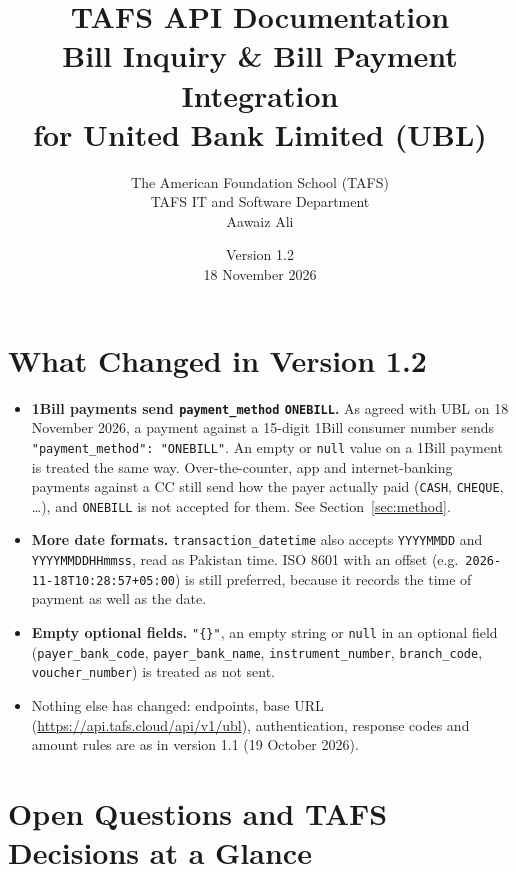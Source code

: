 \documentclass[11pt]{article}
\title{\textbf{TAFS API Documentation} \\[4pt]
\large Bill Inquiry \& Bill Payment Integration \\ for United Bank Limited (UBL)}
\author{The American Foundation School (TAFS) \\ TAFS IT and Software Department \\[4pt] Aawaiz Ali}
\date{Version 1.2 \\ 18 November 2026}
\begin{document}
\begin{titlepage}
\vspace*{\fill}
{\let\newpage\relax\maketitle}
\thispagestyle{empty}
\vspace*{\fill}
\end{titlepage}

\section*{What Changed in Version 1.2}
\begin{itemize}
  \item \textbf{1Bill payments send \texttt{payment\_method} \texttt{ONEBILL}.} As agreed with UBL on 18 November 2026,
        a payment against a 15-digit 1Bill consumer number sends \texttt{"payment\_method": "ONEBILL"}. An empty or
        \texttt{null} value on a 1Bill payment is treated the same way. Over-the-counter, app and internet-banking payments
        against a CC still send how the payer actually paid (\texttt{CASH}, \texttt{CHEQUE}, \ldots), and
        \texttt{ONEBILL} is not accepted for them. See Section~\ref{sec:method}.
  \item \textbf{More date formats.} \texttt{transaction\_datetime} also accepts \texttt{YYYYMMDD} and
        \texttt{YYYYMMDDHHmmss}, read as Pakistan time. ISO 8601 with an offset (e.g.\ \texttt{2026-11-18T10:28:57+05:00})
        is still preferred, because it records the time of payment as well as the date.
  \item \textbf{Empty optional fields.} \texttt{"\{\}"}, an empty string or \texttt{null} in an optional field
        (\texttt{payer\_bank\_code}, \texttt{payer\_bank\_name}, \texttt{instrument\_number}, \texttt{branch\_code},
        \texttt{voucher\_number}) is treated as not sent.
  \item Nothing else has changed: endpoints, base URL (\url{https://api.tafs.cloud/api/v1/ubl}), authentication,
        response codes and amount rules are as in version 1.1 (19 October 2026).
\end{itemize}

\section*{Open Questions and TAFS Decisions at a Glance}
\end{document}
